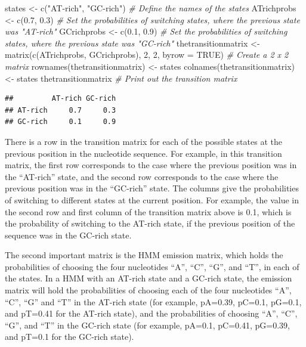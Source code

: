 \documentclass[
]{book}
\newenvironment{Shaded}{\begin{snugshade}}{\end{snugshade}}
\newcommand{\AttributeTok}[1]{\textcolor[rgb]{0.77,0.63,0.00}{#1}}
\newcommand{\CommentTok}[1]{\textcolor[rgb]{0.56,0.35,0.01}{\textit{#1}}}
\newcommand{\ConstantTok}[1]{\textcolor[rgb]{0.00,0.00,0.00}{#1}}
\newcommand{\DecValTok}[1]{\textcolor[rgb]{0.00,0.00,0.81}{#1}}
\newcommand{\FloatTok}[1]{\textcolor[rgb]{0.00,0.00,0.81}{#1}}
\newcommand{\FunctionTok}[1]{\textcolor[rgb]{0.00,0.00,0.00}{#1}}
\newcommand{\NormalTok}[1]{#1}
\newcommand{\OtherTok}[1]{\textcolor[rgb]{0.56,0.35,0.01}{#1}}
\newcommand{\StringTok}[1]{\textcolor[rgb]{0.31,0.60,0.02}{#1}}
\begin{document}
\begin{Shaded}
\begin{Highlighting}[]
\NormalTok{states              }\OtherTok{\textless{}{-}} \FunctionTok{c}\NormalTok{(}\StringTok{"AT{-}rich"}\NormalTok{, }\StringTok{"GC{-}rich"}\NormalTok{) }\CommentTok{\# Define the names of the states}
\NormalTok{ATrichprobs         }\OtherTok{\textless{}{-}} \FunctionTok{c}\NormalTok{(}\FloatTok{0.7}\NormalTok{, }\FloatTok{0.3}\NormalTok{)             }\CommentTok{\# Set the probabilities of switching states, where the previous state was "AT{-}rich"}
\NormalTok{GCrichprobs         }\OtherTok{\textless{}{-}} \FunctionTok{c}\NormalTok{(}\FloatTok{0.1}\NormalTok{, }\FloatTok{0.9}\NormalTok{)             }\CommentTok{\# Set the probabilities of switching states, where the previous state was "GC{-}rich"}
\NormalTok{thetransitionmatrix }\OtherTok{\textless{}{-}} \FunctionTok{matrix}\NormalTok{(}\FunctionTok{c}\NormalTok{(ATrichprobs, GCrichprobs), }\DecValTok{2}\NormalTok{, }\DecValTok{2}\NormalTok{, }\AttributeTok{byrow =} \ConstantTok{TRUE}\NormalTok{) }\CommentTok{\# Create a 2 x 2 matrix}
\FunctionTok{rownames}\NormalTok{(thetransitionmatrix) }\OtherTok{\textless{}{-}}\NormalTok{ states}
\FunctionTok{colnames}\NormalTok{(thetransitionmatrix) }\OtherTok{\textless{}{-}}\NormalTok{ states}
\NormalTok{thetransitionmatrix                            }\CommentTok{\# Print out the transition matrix}
\end{Highlighting}
\end{Shaded}

\begin{verbatim}
##         AT-rich GC-rich
## AT-rich     0.7     0.3
## GC-rich     0.1     0.9
\end{verbatim}

There is a row in the transition matrix for each of the possible states at the previous position in the nucleotide sequence. For example, in this transition matrix, the first row corresponds to the case where the previous position was in the ``AT-rich'' state, and the second row corresponds to the case where the previous position was in the ``GC-rich'' state. The columns give the probabilities of switching to different states at the current position. For example, the value in the second row and first column of the transition matrix above is 0.1, which is the probability of switching to the AT-rich state, if the previous position of the sequence was in the GC-rich state.

The second important matrix is the HMM emission matrix, which holds the probabilities of choosing the four nucleotides ``A'', ``C'', ``G'', and ``T'', in each of the states. In a HMM with an AT-rich state and a GC-rich state, the emission matrix will hold the probabilities of choosing each of the four nucleotides ``A'', ``C'', ``G'' and ``T'' in the AT-rich state (for example, pA=0.39, pC=0.1, pG=0.1, and pT=0.41 for the AT-rich state), and the probabilities of choosing ``A'', ``C'', ``G'', and ``T'' in the GC-rich state (for example, pA=0.1, pC=0.41, pG=0.39, and pT=0.1 for the GC-rich state).
\end{document}
